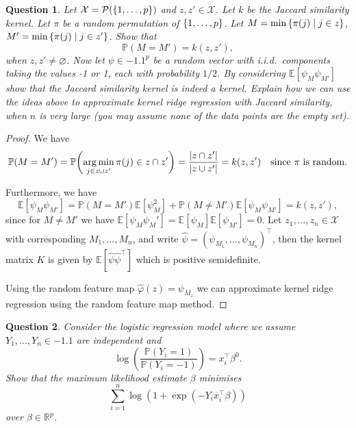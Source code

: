 \documentclass{article}
\theoremstyle{plain}
\newtheorem{question}{Question}
\theoremstyle{remark}
\renewcommand{\emptyset}{\varnothing}
\renewcommand{\phi}{\varphi}
\newcommand{\Bb}{\mathbb}
\newcommand{\Cal}{\mathcal}
\newcommand{\PP}{\Bb P}
\newcommand{\RR}{\Bb R}
\newcommand{\EE}{\Bb E}
\newcommand\XX{\Cal X}
\newcommand{\T}{^\top} %
\newcommand\pow{\Cal P} %
\DeclareMathOperator*{\argmin}{arg\,min}
\begin{document}
\begin{question}
	Let $\XX = \pow(\qty{1, \dotsc, p})$ and $z, z' \in \XX$. Let $k$ be the Jaccard similarity kernel. Let $\pi$ be a random permutation of $\qty{1, \dotsc, p}$. Let $M = \min\qty{\pi(j) \mid j \in z}$, $M' = \min\qty{\pi(j) \mid j \in z'}$. Show that
	\[
	\PP(M = M') = k(z, z'),
	\]
	when $z, z' \neq \emptyset$. Now let $\psi \in \qty{-1, 1}^p$ be a random vector with i.i.d.\ components taking the values -1 or 1, each with probability $1/2$. By considering $\EE[\psi_M\psi_{M'}]$ show that the Jaccard similarity kernel is indeed a kernel. Explain how we can use the ideas above to approximate kernel ridge regression with Jaccard similarity, when $n$ is very large (you may assume none of the data points are the empty set). 
\end{question}

\begin{proof}
	We have \[
	\PP(M = M') = \PP\qty(\argmin_{j \in z \cup z'} \pi(j) \in z \cap z') = \frac{\abs{z \cap z'}}{\abs{z \cup z'}} = k(z, z') \quad\text{since $\pi$ is random.}
	\]
	
	Furthermore, we have
	\[
	\EE[\psi_M \psi_{M'}] = \PP(M = M') \EE[\psi_M^2] + \PP(M \neq M') \EE[\psi_M \psi_{M'}] = k(z, z'), 
	\]
	since for $M \neq M'$ we have $\EE[\psi_M\psi_M'] = \EE[\psi_M]\EE[\psi_{M'}] = 0$. 
	Let $z_1, \dotsc, z_n \in \XX$ with corresponding $M_1, \dotsc, M_n$, and write $\hat \psi = (\psi_{M_1}, \dotsc, \psi_{M_n})\T$, then the kernel matrix $K$ is given by $\EE[\hat\psi \hat\psi\T]$ which is positive semidefinite. 
	
	Using the random feature map $\hat\phi(z) = \psi_{M_z}$ we can approximate kernel ridge regression using the random feature map method. 
\end{proof}

\begin{question}
	Consider the logistic regression model where we assume $Y_1, \dotsc, Y_n \in \qty{-1, 1}$ are independent and
	\[
	\log(\frac{\PP(Y_i = 1)}{\PP(Y_i = -1)}) = x_i\T\beta^0. 
	\]
	Show that the maximum likelihood estimate $\beta$ minimises
	\[
	\sum_{i=1}^n \log(1 + \exp(-Y_i x_i\T \beta))
	\]
	over $\beta \in \RR^p$. 
\end{question}
\end{document}
